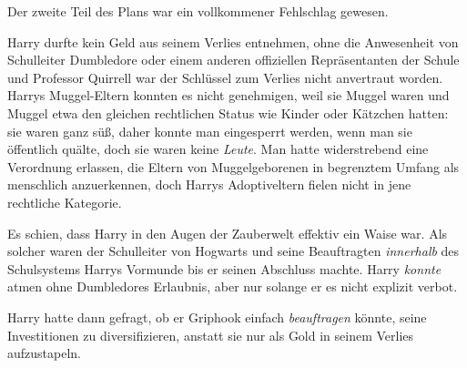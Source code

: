 Der zweite Teil des Plans war ein vollkommener Fehlschlag gewesen.

Harry durfte kein Geld aus seinem Verlies entnehmen, ohne die Anwesenheit von Schulleiter Dumbledore oder einem anderen offiziellen Repräsentanten der Schule und Professor Quirrell war der Schlüssel zum Verlies nicht anvertraut worden. Harrys Muggel-Eltern konnten es nicht genehmigen, weil sie Muggel waren und Muggel etwa den gleichen rechtlichen Status wie Kinder oder Kätzchen hatten: sie waren ganz süß, daher konnte man eingesperrt werden, wenn man sie öffentlich quälte, doch sie waren keine \emph{Leute}. Man hatte widerstrebend eine Verordnung erlassen, die Eltern von Muggelgeborenen in begrenztem Umfang als menschlich anzuerkennen, doch Harrys Adoptiveltern fielen nicht in jene rechtliche Kategorie.

Es schien, dass Harry in den Augen der Zauberwelt effektiv ein Waise war. Als solcher waren der Schulleiter von Hogwarts und seine Beauftragten \emph{innerhalb} des Schulsystems Harrys Vormunde bis er seinen Abschluss machte. Harry \emph{konnte} atmen ohne Dumbledores Erlaubnis, aber nur solange er es nicht explizit verbot.

Harry hatte dann gefragt, ob er Griphook einfach \emph{beauftragen} könnte, seine Investitionen zu diversifizieren, anstatt sie nur als Gold in seinem Verlies aufzustapeln.

